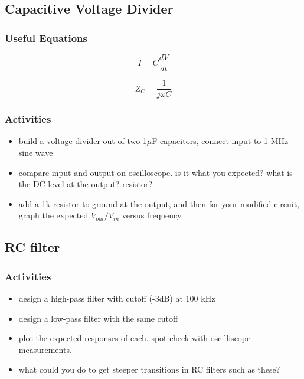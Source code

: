 \documentclass[11pt]{article}
\begin{document}
\subsection{Capacitive Voltage Divider}

\subsubsection{Useful Equations}
\begin{equation}
I=C\frac{dV}{dt}
\end{equation}

\begin{equation}
Z_C = \frac1{j\omega C}
\end{equation}

\subsubsection{Activities}

\begin{itemize}
\item build a voltage divider out of two 1$\mu$F capacitors, connect input to 1 MHz sine wave
\item compare input and output on oscilloscope.  is it what you expected? what is the DC level at the output?
resistor?
\item add a 1k resistor to ground at the output, and then for your modified circuit, graph the 
expected $V_{out}/V_{in}$ versus frequency
\end{itemize}

\subsection{RC filter}

\subsubsection{Activities}
\begin{itemize}
\item design a high-pass filter with cutoff (-3dB) at 100 kHz
\item design a low-pass filter with the same cutoff
\item plot the expected responses of each.  spot-check with oscilliscope measurements.
\item what could you do to get steeper transitions in RC filters such as these?
\end{itemize}
\end{document}
